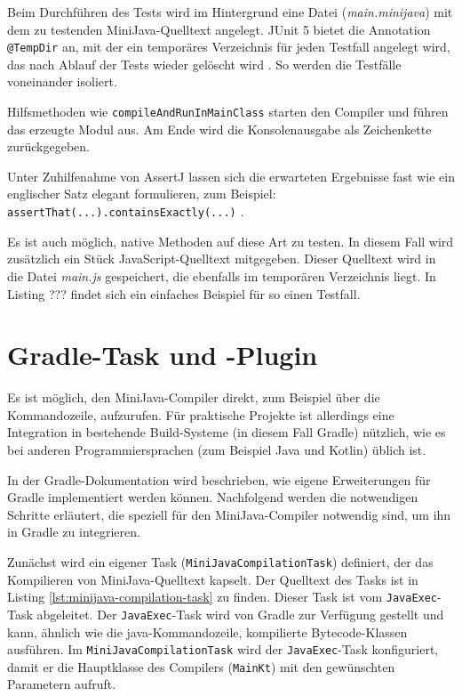 \pagebreak


Beim Durchführen des Tests wird im Hintergrund eine Datei (\emph{main.minijava}) mit dem zu testenden MiniJava-Quelltext angelegt. JUnit 5 bietet die Annotation \lstinline{@TempDir} an, mit der ein temporäres Verzeichnis für jeden Testfall angelegt wird, das nach Ablauf der Tests wieder gelöscht wird \cite{JUnit}. So werden die Testfälle voneinander isoliert.

Hilfsmethoden wie \lstinline{compileAndRunInMainClass} starten den Compiler und führen das erzeugte Modul aus. Am Ende wird die Konsolenausgabe als Zeichenkette zurückgegeben.

Unter Zuhilfenahme von AssertJ lassen sich die erwarteten Ergebnisse fast wie ein englischer Satz elegant formulieren, zum Beispiel: \lstinline{assertThat(...).containsExactly(...)} \cite{AssertJ}.

Es ist auch möglich, native Methoden auf diese Art zu testen. In diesem Fall wird zusätzlich ein Stück JavaScript-Quelltext mitgegeben. Dieser Quelltext wird in die Datei \emph{main.js} gespeichert, die ebenfalls im temporären Verzeichnis liegt. In Listing ??? findet sich ein einfaches Beispiel für so einen Testfall.



\pagebreak
\section{Gradle-Task und -Plugin}
\label{sec:GradleTask-und-Plugin}

Es ist möglich, den MiniJava-Compiler direkt, zum Beispiel über die Kommandozeile, aufzurufen. Für praktische Projekte ist allerdings eine Integration in bestehende Build-Systeme (in diesem Fall Gradle) nützlich, wie es bei anderen Programmiersprachen (zum Beispiel Java und Kotlin) üblich ist.

In der Gradle-Dokumentation \cite{Gradle} wird beschrieben, wie eigene Erweiterungen für Gradle implementiert werden können. Nachfolgend werden die notwendigen Schritte erläutert, die speziell für den MiniJava-Compiler notwendig sind, um ihn in Gradle zu integrieren.

Zunächst wird ein eigener Task (\lstinline{MiniJavaCompilationTask}) definiert, der das Kompilieren von MiniJava-Quelltext kapselt. Der Quelltext des Tasks ist in Listing \ref{lst:minijava-compilation-task} zu finden. Dieser Task ist vom \lstinline{JavaExec}-Task abgeleitet. Der \lstinline{JavaExec}-Task wird von Gradle zur Verfügung gestellt und kann, ähnlich wie die java-Komman\-dozeile, kompilierte Bytecode-Klassen ausführen. Im \lstinline{MiniJavaCompilationTask} wird der \lstinline{JavaExec}-Task konfiguriert, damit er die Hauptklasse des Compilers (\lstinline{MainKt}) mit den gewünschten Parametern aufruft.

